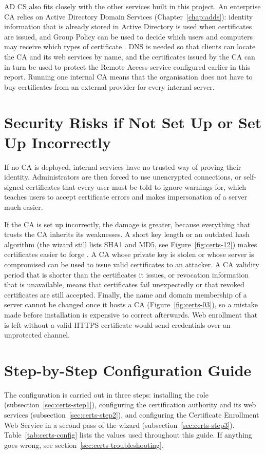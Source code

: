 AD CS also fits closely with the other services built in this project. An enterprise CA relies on Active Directory Domain Services (Chapter~\ref{chap:adds}): identity information that is already stored in Active Directory is used when certificates are issued, and Group Policy can be used to decide which users and computers may receive which types of certificate \cite{certs-overview}. DNS is needed so that clients can locate the CA and its web services by name, and the certificates issued by the CA can in turn be used to protect the Remote Access service configured earlier in this report. Running one internal CA means that the organisation does not have to buy certificates from an external provider for every internal server.

\section{Security Risks if Not Set Up or Set Up Incorrectly}
\label{sec:certs-risks}
If no CA is deployed, internal services have no trusted way of proving their identity. Administrators are then forced to use unencrypted connections, or self-signed certificates that every user must be told to ignore warnings for, which teaches users to accept certificate errors and makes impersonation of a server much easier.

If the CA is set up incorrectly, the damage is greater, because everything that trusts the CA inherits its weaknesses. A short key length or an outdated hash algorithm (the wizard still lists SHA1 and MD5, see Figure~\ref{fig:certs-12}) makes certificates easier to forge \cite{certs-docs}. A CA whose private key is stolen or whose server is compromised can be used to issue valid certificates to an attacker. A CA validity period that is shorter than the certificates it issues, or revocation information that is unavailable, means that certificates fail unexpectedly or that revoked certificates are still accepted. Finally, the name and domain membership of a server cannot be changed once it hosts a CA (Figure~\ref{fig:certs-03}), so a mistake made before installation is expensive to correct afterwards. Web enrollment that is left without a valid HTTPS certificate would send credentials over an unprotected channel.

\section{Step-by-Step Configuration Guide}
\label{sec:certs-guide}
The configuration is carried out in three steps: installing the role (subsection~\ref{sec:certs-step1}), configuring the certification authority and its web services (subsection~\ref{sec:certs-step2}), and configuring the Certificate Enrollment Web Service in a second pass of the wizard (subsection~\ref{sec:certs-step3}). Table~\ref{tab:certs-config} lists the values used throughout this guide. If anything goes wrong, see section~\ref{sec:certs-troubleshooting}.


